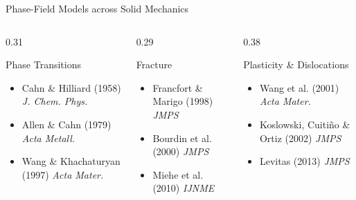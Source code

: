 \documentclass[10pt, aspectratio=169]{beamer}
\begin{document}
\begin{frame}{Phase-Field Models across Solid Mechanics}
    \vspace{0.2cm}
    \begin{columns}[T, onlytextwidth]
        \begin{column}{0.31\textwidth}
            \begin{block}{Phase Transitions}
                \scriptsize
                \raggedright
                \begin{itemize}
                    \item Cahn \& Hilliard (1958) \textit{J. Chem. Phys.}
                    \item Allen \& Cahn (1979) \textit{Acta Metall.}
                    \item Wang \& Khachaturyan (1997) \textit{Acta Mater.} 
                \end{itemize}
            \end{block}
        \end{column}
        
        \begin{column}{0.29\textwidth}
            \begin{block}{Fracture}
                \scriptsize
                \raggedright
                \begin{itemize}
                    \item Francfort \& Marigo (1998) \textit{JMPS}
                    \item Bourdin et al. (2000) \textit{JMPS}
                    \item Miehe et al. (2010) \textit{IJNME}
                \end{itemize}
            \end{block}
        \end{column}
        
        \begin{column}{0.38\textwidth}
            \begin{block}{Plasticity \& Dislocations}
                \scriptsize
                \raggedright
                \begin{itemize}
                    \item Wang et al. (2001) \textit{Acta Mater.}
                    \item Koslowski, Cuitiño \& Ortiz (2002) \textit{JMPS}
                    \item Levitas (2013) \textit{JMPS}
                \end{itemize}
            \end{block}
        \end{column}
    \end{columns}
    

\end{frame}
\end{document}

